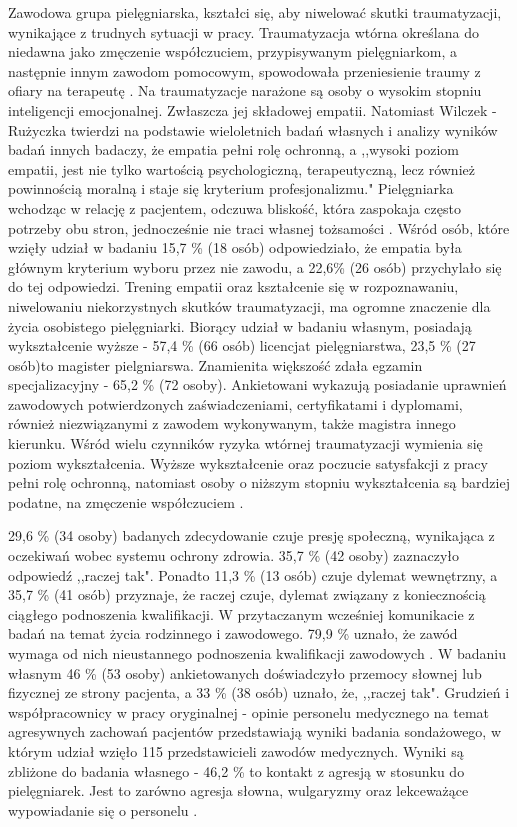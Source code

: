 \documentclass[a4paper,12pt,twoside,openany]{report}
\begin{document}
Zawodowa grupa pielęgniarska, kształci się, aby niwelować skutki traumatyzacji, wynikające z trudnych sytuacji w pracy. Traumatyzacja wtórna określana do niedawna jako zmęczenie współczuciem, przypisywanym pielęgniarkom, a następnie innym zawodom pomocowym, spowodowała przeniesienie traumy z ofiary na terapeutę  \cite{figley}. Na traumatyzacje narażone są osoby o wysokim stopniu inteligencji emocjonalnej. Zwłaszcza jej składowej empatii. Natomiast Wilczek -  Rużyczka twierdzi na podstawie wieloletnich badań własnych i analizy wyników badań innych badaczy, że empatia pełni rolę ochronną, a ,,wysoki poziom  empatii, jest nie tylko wartością psychologiczną, terapeutyczną, lecz również powinnością moralną i staje się kryterium profesjonalizmu."  Pielęgniarka wchodząc w relację z pacjentem, odczuwa bliskość, która zaspokaja często potrzeby obu stron, jednocześnie nie traci własnej tożsamości \cite{wilczek}. Wśród osób, które wzięły udział w badaniu  15,7 \% (18 osób) odpowiedziało, że empatia była głównym kryterium wyboru przez nie zawodu,  a 22,6\% (26 osób) przychylało się do tej odpowiedzi. Trening empatii oraz kształcenie się w  rozpoznawaniu, niwelowaniu niekorzystnych skutków traumatyzacji,  ma ogromne znaczenie dla życia osobistego pielęgniarki. Biorący udział w badaniu własnym,  posiadają wykształcenie wyższe - 57,4 \% (66 osób) licencjat pielęgniarstwa,  23,5 \% (27 osób)to magister pielgniarswa. Znamienita większość zdała egzamin specjalizacyjny - 65,2 \% (72 osoby). Ankietowani wykazują posiadanie uprawnień zawodowych potwierdzonych zaświadczeniami, certyfikatami i dyplomami, również niezwiązanymi z zawodem wykonywanym, także  magistra innego kierunku. Wśród wielu czynników ryzyka wtórnej traumatyzacji wymienia się poziom wykształcenia. Wyższe wykształcenie oraz poczucie satysfakcji z pracy pełni rolę ochronną, natomiast osoby o niższym stopniu wykształcenia są bardziej podatne, na zmęczenie współczuciem \cite{ogińska}.


29,6 \%  (34 osoby) badanych zdecydowanie czuje presję społeczną, wynikająca z oczekiwań wobec systemu ochrony zdrowia. 35,7 \% (42 osoby) zaznaczyło odpowiedź ,,raczej tak". Ponadto 11,3 \% (13 osób)  czuje dylemat wewnętrzny, a 35,7 \%  (41 osób) przyznaje, że raczej czuje, dylemat związany z koniecznością ciągłego podnoszenia kwalifikacji.  W przytaczanym wcześniej komunikacie z badań na temat życia rodzinnego i zawodowego. 79,9 \% uznało, że zawód wymaga od nich nieustannego podnoszenia kwalifikacji zawodowych \cite{komunikat}. W badaniu własnym 46 \% (53 osoby) ankietowanych doświadczyło przemocy słownej lub fizycznej ze strony pacjenta, a 33 \% (38 osób) uznało, że, ,,raczej tak".  Grudzień i współpracownicy w pracy oryginalnej - opinie personelu medycznego na temat agresywnych zachowań pacjentów przedstawiają wyniki badania sondażowego, w którym udział wzięło 115 przedstawicieli zawodów medycznych. Wyniki są zbliżone do badania własnego - 46,2 \% to kontakt z agresją w stosunku do pielęgniarek. Jest to zarówno agresja słowna, wulgaryzmy oraz lekceważące wypowiadanie się o personelu \cite{grudzień}. 
\end{document}

